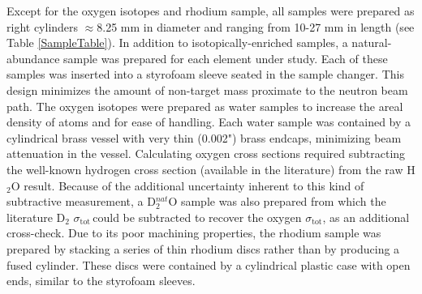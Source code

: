 \documentclass[twocolumn,secnumarabic,amssymb, nobibnotes, aps, prl,
superscriptaddress, nobalancelastpage]{revtex4}
\newcommand{\tot}{\ensuremath{\sigma_{\text{tot}}}}
\newcommand{\tots}{\ensuremath{\sigma_{\text{tot}}\,}}
\begin{document}
Except for the oxygen isotopes and rhodium sample, all samples were prepared as 
right cylinders 
$\approx$8.25 mm in diameter and ranging from 10-27 mm in length (see Table
\ref{SampleTable}). In addition
to isotopically-enriched samples, a natural-abundance sample was prepared for 
each element under study. Each of these samples was inserted into a styrofoam
sleeve seated in the sample changer. This design minimizes the amount of non-target
mass proximate to the neutron beam path.
The oxygen isotopes were prepared as water samples to increase the areal density 
of atoms and for ease of handling. Each water sample was contained by a
cylindrical brass vessel with very thin (0.002") brass endcaps, minimizing beam 
attenuation in the vessel. Calculating oxygen cross sections
required subtracting the well-known hydrogen
cross section (available in the literature) from the raw H$_{2}$O result. 
Because of the additional
uncertainty inherent to this kind of subtractive measurement, a D$_{2}^{nat}$O
sample was also prepared from which the literature D$_{2}$ \tots could be
subtracted to recover the oxygen \tot, as an additional cross-check.
Due to its poor machining properties, the rhodium sample was prepared by
stacking a series of thin rhodium discs rather than by producing a fused 
cylinder. These discs were contained by a cylindrical plastic case with open
ends, similar to the styrofoam sleeves.
\end{document}
